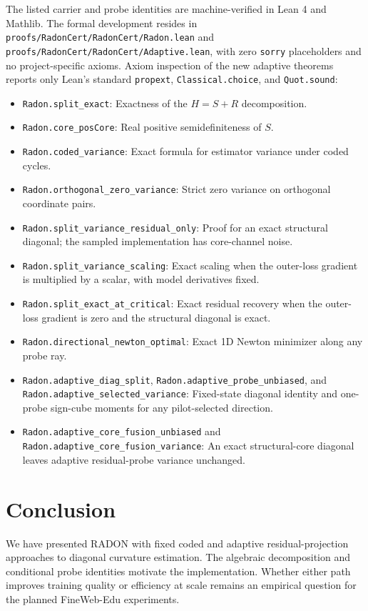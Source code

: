 \documentclass[11pt,a4paper]{article}
\theoremstyle{definition}
\theoremstyle{remark}
\begin{document}
The listed carrier and probe identities are machine-verified in Lean 4 and Mathlib. The formal development resides in \texttt{proofs/RadonCert/RadonCert/Radon.lean} and \texttt{proofs/RadonCert/RadonCert/Adaptive.lean}, with zero \texttt{sorry} placeholders and no project-specific axioms. Axiom inspection of the new adaptive theorems reports only Lean's standard \texttt{propext}, \texttt{Classical.choice}, and \texttt{Quot.sound}:
\begin{itemize}
    \item \texttt{Radon.split\_exact}: Exactness of the $H = S + R$ decomposition.
    \item \texttt{Radon.core\_posCore}: Real positive semidefiniteness of $S$.
    \item \texttt{Radon.coded\_variance}: Exact formula for estimator variance under coded cycles.
    \item \texttt{Radon.orthogonal\_zero\_variance}: Strict zero variance on orthogonal coordinate pairs.
    \item \texttt{Radon.split\_variance\_residual\_only}: Proof for an exact structural diagonal; the sampled implementation has core-channel noise.
    \item \texttt{Radon.split\_variance\_scaling}: Exact scaling when the outer-loss gradient is multiplied by a scalar, with model derivatives fixed.
    \item \texttt{Radon.split\_exact\_at\_critical}: Exact residual recovery when the outer-loss gradient is zero and the structural diagonal is exact.
    \item \texttt{Radon.directional\_newton\_optimal}: Exact 1D Newton minimizer along any probe ray.
    \item \texttt{Radon.adaptive\_diag\_split}, \texttt{Radon.adaptive\_probe\_unbiased}, and \texttt{Radon.adaptive\_selected\_variance}: Fixed-state diagonal identity and one-probe sign-cube moments for any pilot-selected direction.
    \item \texttt{Radon.adaptive\_core\_fusion\_unbiased} and \texttt{Radon.adaptive\_core\_fusion\_variance}: An exact structural-core diagonal leaves adaptive residual-probe variance unchanged.
\end{itemize}

\section{Conclusion}

We have presented RADON with fixed coded and adaptive residual-projection approaches to diagonal curvature estimation. The algebraic decomposition and conditional probe identities motivate the implementation. Whether either path improves training quality or efficiency at scale remains an empirical question for the planned FineWeb-Edu experiments.



\end{document}
